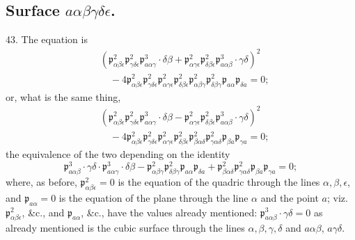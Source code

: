 \documentclass[11pt,a4paper]{article}
\newcommand{\p}{\mathfrak p}
\newcommand{\surf}[1]{\par\smallskip\noindent{\itshape \{Surface $#1$.\}}\par\smallskip}
\begin{document}
\subsection*{Surface \(a\alpha\beta\gamma\delta\epsilon\).}

43. The equation is
\[
\begin{aligned}
&(\p^2_{\alpha\beta\epsilon}\p^2_{\gamma\delta\epsilon}
   \p^3_{a\alpha\gamma}\cdot\delta\beta
 +\p^2_{\alpha\gamma\epsilon}\p^2_{\delta\beta\epsilon}
   \p^3_{a\alpha\beta}\cdot\gamma\delta)^2\\
&\quad -4\p^2_{\alpha\beta\epsilon}\p^2_{\gamma\delta\epsilon}
 \p^2_{\alpha\gamma\epsilon}\p^2_{\delta\beta\epsilon}
 \p^2_{\alpha\beta\gamma}\p^2_{\delta\beta\gamma}
 \p_{a\alpha}\p_{\delta a}=0;
\end{aligned}
\]
or, what is the same thing,
\[
\begin{aligned}
&(\p^2_{\alpha\beta\epsilon}\p^2_{\gamma\delta\epsilon}
   \p^3_{a\alpha\gamma}\cdot\delta\beta
 -\p^2_{\alpha\gamma\epsilon}\p^2_{\delta\beta\epsilon}
   \p^3_{a\alpha\beta}\cdot\gamma\delta)^2\\
&\quad -4\p^2_{\alpha\beta\epsilon}\p^2_{\gamma\delta\epsilon}
 \p^2_{\alpha\gamma\epsilon}\p^2_{\delta\beta\epsilon}
 \p^2_{\beta\alpha\delta}\p^2_{\gamma\alpha\delta}
 \p_{\beta a}\p_{\gamma a}=0;
\end{aligned}
\]
the equivalence of the two depending on the identity
\[
\p^3_{a\alpha\beta}\cdot\gamma\delta\cdot
\p^3_{a\alpha\gamma}\cdot\delta\beta
-\p^2_{\alpha\beta\gamma}\p^2_{\delta\beta\gamma}
 \p_{a\alpha}\p_{\delta a}
+\p^2_{\beta\alpha\delta}\p^2_{\gamma\alpha\delta}
 \p_{\beta a}\p_{\gamma a}=0;
\]
where, as before, $\p^2_{\alpha\beta\epsilon}=0$ is the equation of the quadric
through the lines $\alpha,\beta,\epsilon$, and $\p_{a\alpha}=0$ is the equation of
the plane through the line $\alpha$ and the point $a$; viz. $\p^2_{\alpha\beta\epsilon}$,
\&c., and $\p_{a\alpha}$, \&c., have the values already mentioned:
$\p^3_{a\alpha\beta}\cdot\gamma\delta=0$ as already mentioned is the cubic surface
through the lines $\alpha,\beta,\gamma,\delta$ and $a\alpha\beta$, $a\gamma\delta$.
\surf{a\alpha\beta\gamma\delta\epsilon}
\end{document}
